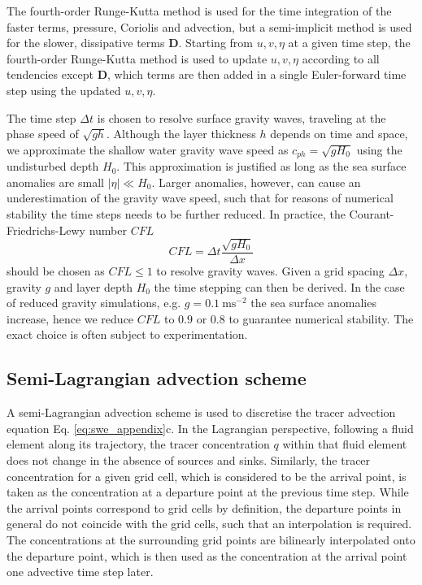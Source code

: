 The fourth-order Runge-Kutta method \citep{Butcher2016} is used for the time integration of the faster terms, pressure, Coriolis and advection,
but a semi-implicit method is used for the slower, dissipative terms $\mathbf{D}$. Starting from $u,v,\eta$ at a given time step,
the fourth-order Runge-Kutta method is used to update $u,v,\eta$ according to all tendencies except $\mathbf{D}$, which terms are
then added in a single Euler-forward time step using the updated $u,v,\eta$.

The time step $\Delta t$ is chosen to resolve surface gravity waves, traveling at the phase speed of $\sqrt{gh}$. Although
the layer thickness $h$ depends on time and space, we approximate the shallow water gravity wave speed as $c_{ph} = \sqrt{gH_0}$
using the undisturbed depth $H_0$. This approximation is justified as long as the sea surface anomalies are small $\vert \eta \vert \ll H_0$.
Larger anomalies, however, can cause an underestimation of the gravity wave speed, such that for reasons of numerical stability
the time steps needs to be further reduced. In practice, the Courant-Friedrichs-Lewy number $CFL$ \citep{Courant1967}
\begin{equation}
	CFL = \Delta t \frac{\sqrt{gH_0}}{\Delta x}
	\label{eq:cfl}
\end{equation}
should be chosen as $CFL \leq 1$ to resolve gravity waves. Given a grid spacing $\Delta x$, gravity $g$ and layer depth $H_0$
the time stepping can then be derived. In the case of reduced gravity simulations, e.g. $g=0.1~\mathrm{ms}^{-2}$ the
sea surface anomalies increase, hence we reduce $CFL$ to $0.9$ or $0.8$ to guarantee numerical stability. The exact choice is often subject
to experimentation.

\subsection{Semi-Lagrangian advection scheme}
\label{sec:semi_lagrange_appendix}
A semi-Lagrangian advection scheme \citep{Smolarkiewicz1992} is used to discretise the tracer advection equation Eq. \ref{eq:swe_appendix}c.
In the Lagrangian perspective, following a fluid element along its trajectory, the tracer concentration $q$ within that fluid element
does not change in the absence of sources and sinks. Similarly, the tracer concentration for a given grid cell, which is considered
to be the arrival point, is taken as the concentration at a departure point at the previous time step. While the arrival points correspond
to grid cells by definition, the departure points in general do not coincide with the grid cells, such that an interpolation is required.
The concentrations at the surrounding grid points are bilinearly interpolated onto the departure point, which is then used as the
concentration at the arrival point one advective time step later.

